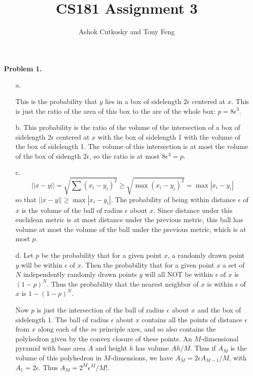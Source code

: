 \documentclass[12pt]{amsart}
\title{CS181 Assignment 3}
\author{Ashok Cutkosky and Tony Feng}
\theoremstyle{remark}
\begin{document}
\maketitle

\noindent \textbf{Problem 1.}
\begin{enumerate}

\item[a.]

This is the probability that $y$ lies in a box of sidelength $2\epsilon$ centered at $x$. This is just the ratio of the area of this box to the are of the whole box: $p=8\epsilon^3$.


\item[b.]
This probability is the ratio of the volume of the intersection of a box of sidelength $2\epsilon$ centered at $x$ with the box of sidelength 1 with the volume of the box of sidelength 1. The volume of this intersection is at most the volume of the box of sidength $2\epsilon$, so the ratio is at most $8\epsilon^3=p$.

\item[c.]
\[
||x-y||=\sqrt{\sum (x_i-y_i)^2}\ge \sqrt{\max (x_i-y_i)^2}=\max |x_i-y_i|
\]
so that $||x-y||\ge \max |x_i-y_i|$. The probability of being within distance $\epsilon$ of $x$ is the volume of the ball of radius $\epsilon$ about $x$. Since distance under this euclidean metric is at most distance under the previous metric, this ball has volume at most the volume of the ball under the previous metric, which is at most $p$.

\item[d.]
Let $p$ be the probability that for a given point $x$, a randomly drawn point $y$ will be within $\epsilon$ of $x$. Then the probability that for a given point $x$ a set of $N$ independently randomly drawn points $y$ will all NOT be within $\epsilon$ of $x$ is $(1-p)^N$. Thus the probability that the nearest neighbor of $x$ is within $\epsilon$ of $x$ is $1-(1-p)^N$.

Now $p$ is just the intersection of the ball of radius $\epsilon$ about $x$ and the box of sidelength $1$. The ball of radius $\epsilon$ about $x$ contains all the points of distance $\epsilon$ from $x$ along each of the $m$ principle axes, and so also contains the polyhedron given by the convex closure of these points. An $M$-dimensional pyramid with base area $A$ and height $h$ has volume $Ah/M$. Thus if $A_M$ is the volume of this polyhedron in $M$-dimensions, we have $A_M=2\epsilon A_{M-1}/M$, with $A_1=2\epsilon$. Thus $A_M=2^M\epsilon^M/M!$.


\end{enumerate}
\end{document}
